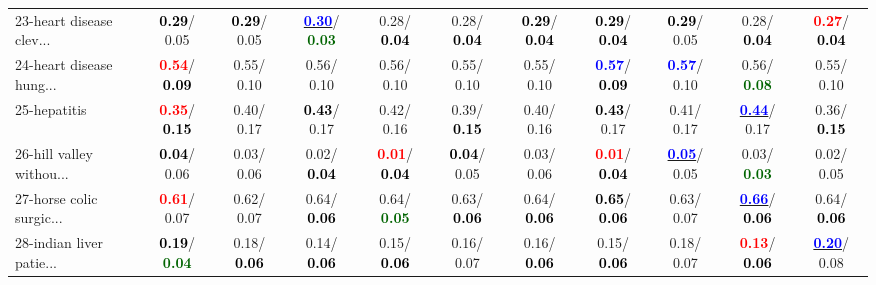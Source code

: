 \begin{table}[h]
\begin{center}
{\begin{tabular}{lc|c|c|c|c|c|c|c|c|c}
23-heart disease clev... & \textcolor{black}{\textbf{  0.29}}/  0.05 & \textcolor{black}{\textbf{  0.29}}/  0.05 & \underline{\textcolor{blue}{\textbf{  0.30}}}/\textcolor{darkgreen}{\textbf{  0.03}} &   0.28/\textcolor{black}{\textbf{  0.04}} &   0.28/\textcolor{black}{\textbf{  0.04}} & \textcolor{black}{\textbf{  0.29}}/\textcolor{black}{\textbf{  0.04}} & \textcolor{black}{\textbf{  0.29}}/\textcolor{black}{\textbf{  0.04}} & \textcolor{black}{\textbf{  0.29}}/  0.05 &   0.28/\textcolor{black}{\textbf{  0.04}} & \textcolor{red}{\textbf{  0.27}}/\textcolor{black}{\textbf{  0.04}} \\
24-heart disease hung... & \textcolor{red}{\textbf{  0.54}}/\textcolor{black}{\textbf{  0.09}} &   0.55/  0.10 &   0.56/  0.10 &   0.56/  0.10 &   0.55/  0.10 &   0.55/  0.10 & \textcolor{blue}{\textbf{  0.57}}/\textcolor{black}{\textbf{  0.09}} & \textcolor{blue}{\textbf{  0.57}}/  0.10 &   0.56/\textcolor{darkgreen}{\textbf{  0.08}} &   0.55/  0.10 \\
25-hepatitis & \textcolor{red}{\textbf{  0.35}}/\textcolor{black}{\textbf{  0.15}} &   0.40/  0.17 & \textcolor{black}{\textbf{  0.43}}/  0.17 &   0.42/  0.16 &   0.39/\textcolor{black}{\textbf{  0.15}} &   0.40/  0.16 & \textcolor{black}{\textbf{  0.43}}/  0.17 &   0.41/  0.17 & \underline{\textcolor{blue}{\textbf{  0.44}}}/  0.17 &   0.36/\textcolor{black}{\textbf{  0.15}} \\
26-hill valley withou... & \textcolor{black}{\textbf{  0.04}}/  0.06 &   0.03/  0.06 &   0.02/\textcolor{black}{\textbf{  0.04}} & \textcolor{red}{\textbf{  0.01}}/\textcolor{black}{\textbf{  0.04}} & \textcolor{black}{\textbf{  0.04}}/  0.05 &   0.03/  0.06 & \textcolor{red}{\textbf{  0.01}}/\textcolor{black}{\textbf{  0.04}} & \underline{\textcolor{blue}{\textbf{  0.05}}}/  0.05 &   0.03/\textcolor{darkgreen}{\textbf{  0.03}} &   0.02/  0.05 \\
27-horse colic surgic... & \textcolor{red}{\textbf{  0.61}}/  0.07 &   0.62/  0.07 &   0.64/\textcolor{black}{\textbf{  0.06}} &   0.64/\textcolor{darkgreen}{\textbf{  0.05}} &   0.63/\textcolor{black}{\textbf{  0.06}} &   0.64/\textcolor{black}{\textbf{  0.06}} & \textcolor{black}{\textbf{  0.65}}/\textcolor{black}{\textbf{  0.06}} &   0.63/  0.07 & \underline{\textcolor{blue}{\textbf{  0.66}}}/\textcolor{black}{\textbf{  0.06}} &   0.64/\textcolor{black}{\textbf{  0.06}} \\
28-indian liver patie... & \textcolor{black}{\textbf{  0.19}}/\textcolor{darkgreen}{\textbf{  0.04}} &   0.18/\textcolor{black}{\textbf{  0.06}} &   0.14/\textcolor{black}{\textbf{  0.06}} &   0.15/\textcolor{black}{\textbf{  0.06}} &   0.16/  0.07 &   0.16/\textcolor{black}{\textbf{  0.06}} &   0.15/\textcolor{black}{\textbf{  0.06}} &   0.18/  0.07 & \textcolor{red}{\textbf{  0.13}}/\textcolor{black}{\textbf{  0.06}} & \underline{\textcolor{blue}{\textbf{  0.20}}}/  0.08 \\ \hline

\end{tabular}}
\end{center}
\end{table}
